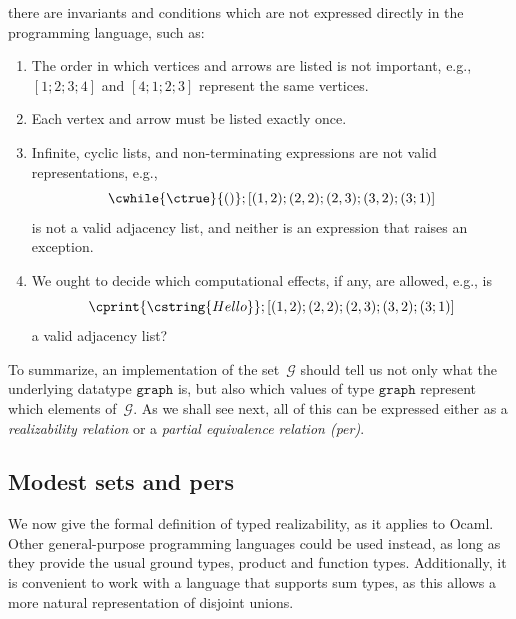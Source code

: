 there are invariants and conditions which are not expressed directly
in the programming language, such as:
%
\begin{enumerate}
\item The order in which vertices and arrows are listed is not
  important, e.g., $[1;2;3;4]$ and $[4;1;2;3]$ represent the same vertices.
\item Each vertex and arrow must be listed exactly once.
\item Infinite, cyclic lists, and non-terminating expressions are not
  valid representations, e.g.,
  \begin{equation*}
    \cwhile{\ctrue}{()}; [(1,2);(2,2);(2,3);(3,2);(3;1)]
  \end{equation*}
  is not a valid adjacency list, and neither is an expression that
  raises an exception.
\item We ought to decide which computational effects, if any, are
  allowed, e.g., is
  \begin{equation*}
    \cprint{\cstring{Hello}}; [(1,2);(2,2);(2,3);(3,2);(3;1)]
  \end{equation*}
  a valid adjacency list?
\end{enumerate}
%
To summarize, an implementation of the set~$\mathcal{G}$ should tell
us not only what the underlying datatype $\mathtt{graph}$ is, but also
which values of type $\mathtt{graph}$ represent which elements
of~$\mathcal{G}$. As we shall see next, all of this can be expressed
either as a \emph{realizability relation} or a \emph{partial
  equivalence relation (per)}.


\subsection{Modest sets and pers}
\label{sec:modest-sets-pers}

We now give the formal definition of typed realizability, as it
applies to Ocaml. Other general-purpose programming languages could be
used instead, as long as they provide the usual ground types, product
and function types. Additionally, it is convenient to work with a
language that supports sum types, as this allows a more natural
representation of disjoint unions.

